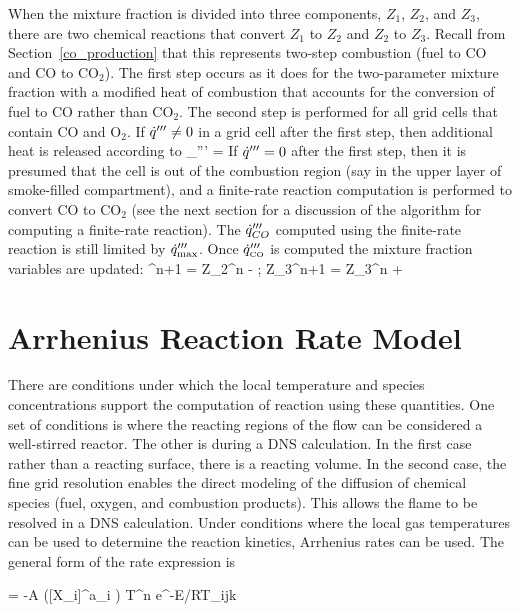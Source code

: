 When the mixture fraction is divided into three components, $Z_1$, $Z_2$, and $Z_3$, there are two chemical
reactions that convert $Z_1$ to $Z_2$ and $Z_2$ to $Z_3$.  Recall from Section~\ref{co_production}
that this represents two-step combustion (fuel to CO and CO to CO$_2$).
The first step occurs as it does for the two-parameter mixture fraction with a modified heat of combustion that
accounts for the conversion of fuel to CO rather than CO$_2$.
The second step is performed for all grid cells that contain CO and O$_2$.   If $\dot{q}''' \neq 0$ in a grid
cell after the first step, then additional heat is released according to
\be \dq_{\CO}''' = \min {}     \ee
If $\dot{q}'''=0$ after the first step, then it is presumed that the cell is out of the combustion region (say in the upper layer of
smoke-filled compartment), and a finite-rate reaction computation is performed to convert CO to CO$_2$ (see the next section for
a discussion of the algorithm for computing a finite-rate reaction).  The $\dot{q}'''_{CO}$ computed using the finite-rate
reaction is still limited by $\dot{q}_{\max}'''$.  Once $\dot{q}'''_{{\tiny \hbox{CO}}}$ is computed the mixture fraction variables are updated:
^{n+1} = {Z_2}^n -  \quad ; \quad
{Z_3}^{n+1} = {Z_3}^n +  \ee



\newpage
\section{Arrhenius Reaction Rate Model}

There are conditions under which the local temperature and species concentrations support the computation of reaction using these quantities.  One set of conditions is where the reacting regions of the flow can be considered a well-stirred reactor.  The other is during a DNS calculation.  In the first case rather than a reacting surface, there is a reacting volume.  In the second case, the fine grid resolution enables the direct modeling of the diffusion of chemical species (fuel,
oxygen, and combustion products).  This allows the flame to be resolved in a DNS calculation.  Under conditions where the local gas
temperatures can be used to determine the reaction kinetics, Arrhenius rates can be used.  The general form of the rate expression is

\be {}    = -A \; \prod \left([X_i]^{a_i} \right) T^n \; e^{-E/RT_{ijk}} \label{Arrheniusrateeqn} \ee


